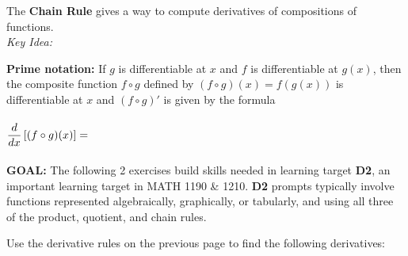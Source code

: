 \documentclass[10pt]{article}
\begin{document}
%    
%




\newpage%



{\bf {}}\mod


The {\bf Chain Rule} gives a way to compute derivatives of compositions of functions. \\
{\em Key Idea:} \\

{\bf Prime notation:} If $g$ is differentiable at $x$ and $f$ is differentiable at $g(x)$, then the composite function $f \circ g$ defined by $(f \circ g)(x)=f(g(x))$ is differentiable at $x$ and $(f \circ g)'$ is given by the formula \\\\

$\displaystyle \frac{d}{dx}\left[ (f\circ g)(x)\right]=$   
\\\\


{\bf\color{blue} GOAL:} The following 2 exercises build skills needed in learning target {\bf\color{ForestGreen}D2}, an important learning target in MATH 1190 \& 1210. {\bf\color{ForestGreen}D2} prompts typically involve functions represented algebraically, graphically, or tabularly, and using all three of the product, quotient, and chain rules.


{} Use the derivative rules on the previous page to find the following derivatives:
\end{document}
